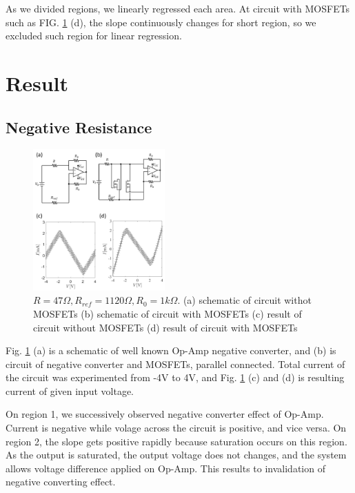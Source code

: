 \documentclass[%
 aip,
amsmath,amssymb,
reprint,
]{revtex4-1}
\begin{document}
As we divided regions, we linearly regressed each area. At circuit with MOSFETs such as FIG. \ref{fig:Fig1} (d), the slope continuously changes for short region, so we excluded such region for linear regression.


\section{\label{sec:Result} Result}

\subsection{Negative Resistance}
\begin{figure}[!h]
  \centering
  \includegraphics[width=0.45\textwidth]{figures/Fig1.png}
  \caption{$R = 47\Omega, R_{ref} = 1120\Omega, R_0 = 1k\Omega$. (a) schematic of circuit withot MOSFETs (b) schematic of circuit with MOSFETs (c) result of circuit without MOSFETs (d) result of circuit with MOSFETs}
  \label{fig:Fig1}
\end{figure}

Fig. \ref{fig:Fig1} (a) is a schematic of well known Op-Amp negative converter, and (b) is circuit of negative converter and MOSFETs, parallel connected. Total current of the circuit was experimented from -4V to 4V, and Fig. \ref{fig:Fig1} (c) and (d) is resulting current of given  input voltage. 


On region 1, we successively observed negative converter effect of Op-Amp. Current is negative while volage across the circuit is positive, and vice versa. On region 2, the slope gets positive rapidly because saturation occurs on this region. As the output is saturated, the output voltage does not changes, and the system allows voltage difference applied on Op-Amp. This results to invalidation of negative converting effect.
\end{document}
